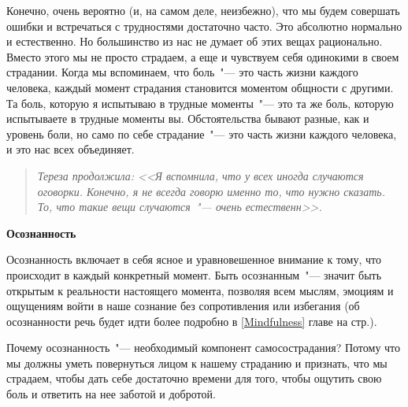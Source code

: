 Конечно, очень вероятно (и, на самом деле, неизбежно), что мы будем совершать ошибки и встречаться с трудностями достаточно часто. Это абсолютно нормально и естественно. Но большинство из нас не думает об этих вещах рационально. Вместо этого мы не просто страдаем, а еще и чувствуем себя одинокими в своем страдании. Когда мы вспоминаем, что боль~"--- это часть жизни каждого человека, каждый момент страдания становится моментом общности с другими. Та боль, которую я испытываю в трудные моменты~"--- это та же боль, которую испытываете в трудные моменты вы. Обстоятельства бывают разные, как и уровень боли, но само по себе страдание~"--- это часть жизни каждого человека, и это нас всех объединяет. 

\begin{quotation}
	\textit{
		Тереза продолжила: <<Я вспомнила, что у всех иногда случаются оговорки. Конечно, я не всегда говорю именно то, что нужно сказать. То, что такие вещи случаются~"--- очень естественн>>.
	} 
\end{quotation}

\vspace{3ex} 

{\large \textbf{Осознанность}}

\vspace{1ex} 

Осознанность включает в себя ясное и уравновешенное внимание к тому, что происходит в каждый конкретный момент. Быть осознанным~"--- значит быть открытым к реальности настоящего момента, позволяя всем мыслям, эмоциям и ощущениям войти в наше сознание без сопротивления или избегания (об осознанности речь будет идти более подробно в \ref{Mindfulness} главе на стр.\:\pageref{Mindfulness}). 

Почему осознанность~"--- необходимый компонент самосострадания? Потому что мы должны уметь повернуться лицом к нашему страданию и признать, что мы страдаем, чтобы дать себе достаточно времени для того, чтобы ощутить свою боль и ответить на нее заботой и добротой.
 
